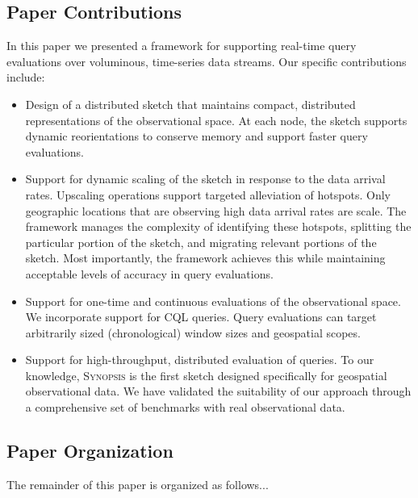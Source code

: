 \subsection{Paper Contributions}
In this paper we presented a framework for supporting real-time query evaluations over voluminous, time-series data streams. Our specific contributions include:
\begin{itemize}
\item   Design of a distributed sketch that maintains compact, distributed representations of the observational space. At each node, the sketch supports dynamic reorientations to conserve memory and support faster query evaluations.
\item   Support for dynamic scaling of the sketch in response to the data arrival rates. Upscaling operations support targeted alleviation of hotspots. Only geographic locations that are observing high data arrival rates are scale. The framework manages the complexity of identifying these hotspots, splitting the particular portion of the sketch, and migrating relevant portions of the sketch. Most importantly, the framework achieves this while maintaining acceptable levels of accuracy in query evaluations.
\item   Support for one-time and continuous evaluations of the observational space. We incorporate support for CQL queries. Query evaluations can target arbitrarily sized (chronological) window sizes and geospatial scopes.
\item   Support for high-throughput, distributed evaluation of queries.
To our knowledge, \textsc{Synopsis} is the first sketch designed specifically for geospatial observational data. We have validated the suitability of our approach through a comprehensive set of benchmarks with real observational data. 
\end{itemize}

\subsection{Paper Organization}
The remainder of this paper is organized as follows...



